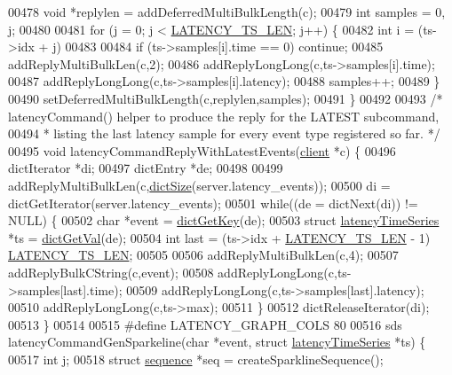 \begin{DoxyCode}
{{{00478     \textcolor{keywordtype}{void} *replylen = addDeferredMultiBulkLength(c);
00479     \textcolor{keywordtype}{int} samples = 0, j;
00480 
00481     \textcolor{keywordflow}{for} (j = 0; j < \hyperlink{latency_8h_a7e3ba352d9d7bb4c88c2c42c16e6674b}{LATENCY\_TS\_LEN}; j++) \{
00482         \textcolor{keywordtype}{int} i = (ts->idx + j) %
00483 
00484         \textcolor{keywordflow}{if} (ts->samples[i].time == 0) \textcolor{keywordflow}{continue};
00485         addReplyMultiBulkLen(c,2);
00486         addReplyLongLong(c,ts->samples[i].time);
00487         addReplyLongLong(c,ts->samples[i].latency);
00488         samples++;
00489     \}
00490     setDeferredMultiBulkLength(c,replylen,samples);
00491 \}
00492 
00493 \textcolor{comment}{/* latencyCommand() helper to produce the reply for the LATEST subcommand,}
00494 \textcolor{comment}{ * listing the last latency sample for every event type registered so far. */}
00495 \textcolor{keywordtype}{void} latencyCommandReplyWithLatestEvents(\hyperlink{structclient}{client} *c) \{
00496     dictIterator *di;
00497     dictEntry *de;
00498 
00499     addReplyMultiBulkLen(c,\hyperlink{dict_8h_af193430dd3d5579a52b194512f72c1f0}{dictSize}(server.latency\_events));
00500     di = dictGetIterator(server.latency\_events);
00501     \textcolor{keywordflow}{while}((de = dictNext(di)) != NULL) \{
00502         \textcolor{keywordtype}{char} *event = \hyperlink{dict_8h_a3271c334309904a3086deca94f96e46e}{dictGetKey}(de);
00503         \textcolor{keyword}{struct} \hyperlink{structlatencyTimeSeries}{latencyTimeSeries} *ts = \hyperlink{dict_8h_ae8d2cc391873b2bea2b87c4f80f43120}{dictGetVal}(de);
00504         \textcolor{keywordtype}{int} last = (ts->idx + \hyperlink{latency_8h_a7e3ba352d9d7bb4c88c2c42c16e6674b}{LATENCY\_TS\_LEN} - 1) %
      \hyperlink{latency_8h_a7e3ba352d9d7bb4c88c2c42c16e6674b}{LATENCY\_TS\_LEN};
00505 
00506         addReplyMultiBulkLen(c,4);
00507         addReplyBulkCString(c,event);
00508         addReplyLongLong(c,ts->samples[last].time);
00509         addReplyLongLong(c,ts->samples[last].latency);
00510         addReplyLongLong(c,ts->max);
00511     \}
00512     dictReleaseIterator(di);
00513 \}
00514 
00515 \textcolor{preprocessor}{#}\textcolor{preprocessor}{define} \textcolor{preprocessor}{LATENCY\_GRAPH\_COLS} 80
00516 sds latencyCommandGenSparkeline(\textcolor{keywordtype}{char} *event, \textcolor{keyword}{struct} \hyperlink{structlatencyTimeSeries}{latencyTimeSeries} *ts) \{
00517     \textcolor{keywordtype}{int} j;
00518     \textcolor{keyword}{struct} \hyperlink{structsequence}{sequence} *seq = createSparklineSequence();
}}}
\end{DoxyCode}
